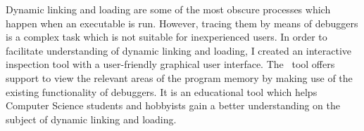 
Dynamic linking and loading are some of the most obscure processes which happen when an executable is run. However, tracing them by means of debuggers is a complex task which is not suitable for inexperienced users. In order to facilitate understanding of dynamic linking and loading, I created an interactive inspection tool with a user-friendly graphical user interface. The \project\ tool offers support to view the relevant areas of the program memory by making use of the existing functionality of debuggers. It is an educational tool which helps Computer Science students and hobbyists gain a better understanding on the subject of dynamic linking and loading.